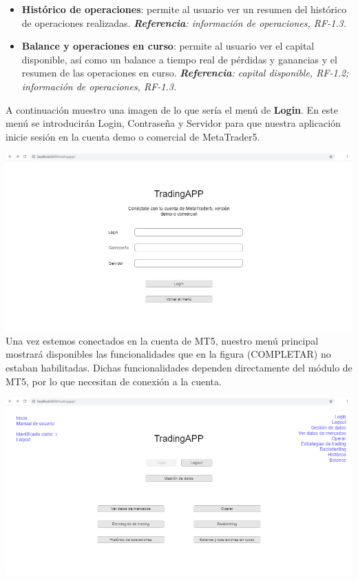 \begin{titlepage}
\begin{itemize}
	\item \textbf{Histórico de operaciones}: permite al usuario ver un resumen del histórico de operaciones realizadas. \textit{\textbf{Referencia}: información de operaciones, RF-1.3.} 
	\item \textbf{Balance y operaciones en curso}: permite al usuario ver el capital disponible, así como un balance a tiempo real de pérdidas y ganancias y el resumen de las operaciones en curso. \textit{\textbf{Referencia}: capital disponible, RF-1.2; información de operaciones, RF-1.3.} 
\end{itemize}

A continuación muestro una imagen de lo que sería el menú de \textbf{Login}. En este menú se introducirán Login, Contraseña y Servidor para que nuestra aplicación inicie sesión en la cuenta demo o comercial de MetaTrader5.\newline

\includegraphics[width=1.2\textwidth]{imagenes/menu_login}\\[0.1cm]

Una vez estemos conectados en la cuenta de MT5, nuestro menú principal mostrará disponibles las funcionalidades que en la figura (COMPLETAR) no estaban habilitadas. Dichas funcionalidades dependen directamente del módulo de MT5, por lo que necesitan de conexión a la cuenta. \newline

\includegraphics[width=1.2\textwidth]{imagenes/menu_principal_logued}\\[0.1cm]




\end{titlepage}